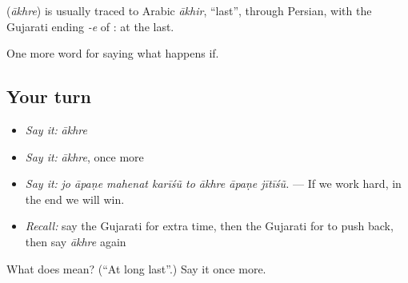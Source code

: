 \begin{cousinweb}
\textbf{} (\emph{ākhre}) is usually traced to Arabic \emph{ākhir}, \textquotedblleft{}last\textquotedblright{}, through Persian, with the Gujarati ending \emph{-e} of \textbf{}: at the last.
\end{cousinweb}

\begin{grammarlens}[title={What you've built}]
One more word for saying what happens if.
\end{grammarlens}

\subsection*{Your turn}
\begin{itemize}
\raggedright
  \item \emph{Say it:} \emph{ākhre}
  \item \emph{Say it:} \emph{ākhre}, once more
  \item \emph{Say it:} \emph{jo āpaṇe mahenat karīśũ to ākhre āpaṇe jītīśũ.} — If we work hard, in the end we will win.
  \item \emph{Recall:} say the Gujarati for extra time, then the Gujarati for to push back, then say \emph{ākhre} again
\end{itemize}

\begin{tcolorbox}[breakable,colback=teal!4,colframe=teal!35!black,title={Before you move on}]
What does  mean? (\textquotedblleft{}At long last\textquotedblright{}.) Say it once more.
\end{tcolorbox}
